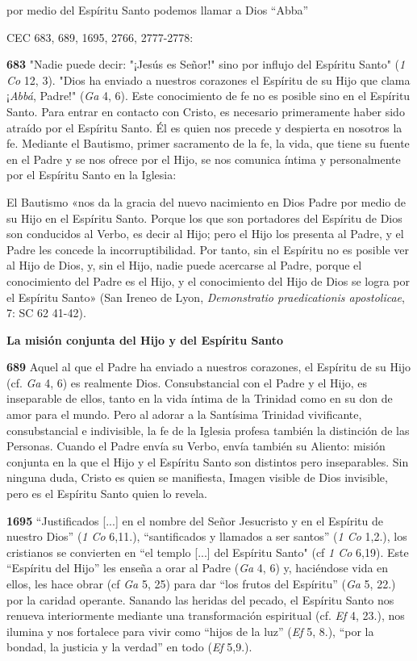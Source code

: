 \documentclass[]{article}
\begin{document}
por medio del Espíritu Santo podemos llamar a Dios ``Abba''

CEC 683, 689, 1695, 2766, 2777-2778:

\textbf{683} "Nadie puede decir: "¡Jesús es Señor!" sino por influjo del
Espíritu Santo" (\emph{1 Co} 12, 3). "Dios ha enviado a nuestros
corazones el Espíritu de su Hijo que clama ¡\emph{Abbá}, Padre!"
(\emph{Ga} 4, 6). Este conocimiento de fe no es posible sino en el
Espíritu Santo. Para entrar en contacto con Cristo, es necesario
primeramente haber sido atraído por el Espíritu Santo. Él es quien nos
precede y despierta en nosotros la fe. Mediante el Bautismo, primer
sacramento de la fe, la vida, que tiene su fuente en el Padre y se nos
ofrece por el Hijo, se nos comunica íntima y personalmente por el
Espíritu Santo en la Iglesia:

El Bautismo «nos da la gracia del nuevo nacimiento en Dios Padre por
medio de su Hijo en el Espíritu Santo. Porque los que son portadores del
Espíritu de Dios son conducidos al Verbo, es decir al Hijo; pero el Hijo
los presenta al Padre, y el Padre les concede la incorruptibilidad. Por
tanto, sin el Espíritu no es posible ver al Hijo de Dios, y, sin el
Hijo, nadie puede acercarse al Padre, porque el conocimiento del Padre
es el Hijo, y el conocimiento del Hijo de Dios se logra por el Espíritu
Santo» (San Ireneo de Lyon, \emph{Demonstratio praedicationis
apostolicae}, 7: SC 62 41-42).

\textbf{La misión conjunta del Hijo y del Espíritu Santo}

\textbf{689} Aquel al que el Padre ha enviado a nuestros corazones, el
Espíritu de su Hijo (cf. \emph{Ga} 4, 6) es realmente Dios.
Consubstancial con el Padre y el Hijo, es inseparable de ellos, tanto en
la vida íntima de la Trinidad como en su don de amor para el mundo. Pero
al adorar a la Santísima Trinidad vivificante, consubstancial e
indivisible, la fe de la Iglesia profesa también la distinción de las
Personas. Cuando el Padre envía su Verbo, envía también su Aliento:
misión conjunta en la que el Hijo y el Espíritu Santo son distintos pero
inseparables. Sin ninguna duda, Cristo es quien se manifiesta, Imagen
visible de Dios invisible, pero es el Espíritu Santo quien lo revela.

\textbf{1695} ``Justificados {[}...{]} en el nombre del Señor Jesucristo
y en el Espíritu de nuestro Dios'' (\emph{1 Co} 6,11.), ``santificados y
llamados a ser santos'' (\emph{1 Co} 1,2.), los cristianos se convierten
en ``el templo {[}...{]} del Espíritu Santo" (cf \emph{1 Co} 6,19). Este
``Espíritu del Hijo'' les enseña a orar al Padre (\emph{Ga} 4, 6) y,
haciéndose vida en ellos, les hace obrar (cf \emph{Ga} 5, 25) para dar
``los frutos del Espíritu'' (\emph{Ga} 5, 22.) por la caridad operante.
Sanando las heridas del pecado, el Espíritu Santo nos renueva
interiormente mediante una transformación espiritual (cf. \emph{Ef} 4,
23.), nos ilumina y nos fortalece para vivir como ``hijos de la luz''
(\emph{Ef} 5, 8.), ``por la bondad, la justicia y la verdad'' en todo
(\emph{Ef} 5,9.).
\end{document}
